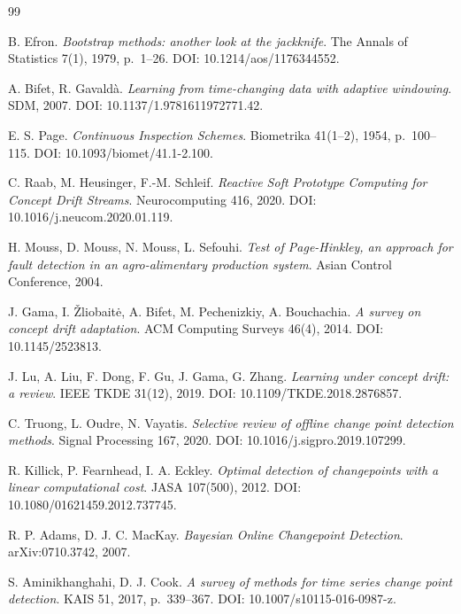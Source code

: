 \documentclass[11pt,a4paper]{article}
\begin{document}
\begin{thebibliography}{99}

B. Efron.
\textit{Bootstrap methods: another look at the jackknife}.
The Annals of Statistics 7(1), 1979, p.~1--26.
DOI: 10.1214/aos/1176344552.

A. Bifet, R. Gavald\`{a}.
\textit{Learning from time-changing data with adaptive windowing}.
SDM, 2007. DOI: 10.1137/1.9781611972771.42.

E. S. Page.
\textit{Continuous Inspection Schemes}.
Biometrika 41(1--2), 1954, p.~100--115.
DOI: 10.1093/biomet/41.1-2.100.

C. Raab, M. Heusinger, F.-M. Schleif.
\textit{Reactive Soft Prototype Computing for Concept Drift Streams}.
Neurocomputing 416, 2020. DOI: 10.1016/j.neucom.2020.01.119.

H. Mouss, D. Mouss, N. Mouss, L. Sefouhi.
\textit{Test of Page-Hinkley, an approach for fault detection in an
agro-alimentary production system}.
Asian Control Conference, 2004.

J. Gama, I. \v{Z}liobait\.{e}, A. Bifet, M. Pechenizkiy, A. Bouchachia.
\textit{A survey on concept drift adaptation}.
ACM Computing Surveys 46(4), 2014. DOI: 10.1145/2523813.

J. Lu, A. Liu, F. Dong, F. Gu, J. Gama, G. Zhang.
\textit{Learning under concept drift: a review}.
IEEE TKDE 31(12), 2019. DOI: 10.1109/TKDE.2018.2876857.

C. Truong, L. Oudre, N. Vayatis.
\textit{Selective review of offline change point detection methods}.
Signal Processing 167, 2020. DOI: 10.1016/j.sigpro.2019.107299.

R. Killick, P. Fearnhead, I. A. Eckley.
\textit{Optimal detection of changepoints with a linear computational cost}.
JASA 107(500), 2012. DOI: 10.1080/01621459.2012.737745.

R. P. Adams, D. J. C. MacKay.
\textit{Bayesian Online Changepoint Detection}.
arXiv:0710.3742, 2007.

S. Aminikhanghahi, D. J. Cook.
\textit{A survey of methods for time series change point detection}.
KAIS 51, 2017, p.~339--367. DOI: 10.1007/s10115-016-0987-z.


\end{thebibliography}
\end{document}
